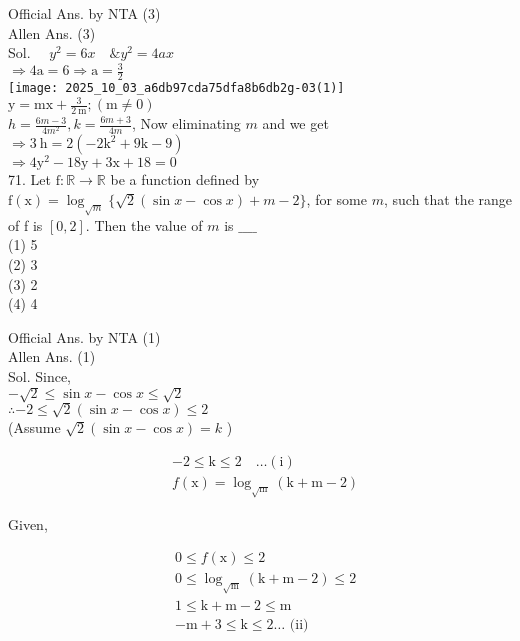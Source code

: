 \documentclass[10pt]{article}
\begin{document}
Official Ans. by NTA (3)\\
Allen Ans. (3)\\
Sol. \(\quad y^{2}=6 x \quad \& y^{2}=4 a x\)\\
\(\Rightarrow 4 \mathrm{a}=6 \Rightarrow \mathrm{a}=\frac{3}{2}\)\\
\texttt{[image: 2025\_10\_03\_a6db97cda75dfa8b6db2g-03(1)]}\\
\(\mathrm{y}=\mathrm{mx}+\frac{3}{2 \mathrm{~m}} ;(\mathrm{m} \neq 0)\)\\
\(h=\frac{6 m-3}{4 m^{2}}, k=\frac{6 m+3}{4 m}\), Now eliminating \(m\) and we get\\
\(\Rightarrow 3 \mathrm{~h}=2\left(-2 \mathrm{k}^{2}+9 \mathrm{k}-9\right)\)\\
\(\Rightarrow 4 \mathrm{y}^{2}-18 \mathrm{y}+3 \mathrm{x}+18=0\)\\
71. Let \(\mathrm{f}: \mathbb{R} \rightarrow \mathbb{R}\) be a function defined by \(\mathrm{f}(\mathrm{x})= \log _{\sqrt{m}}\{\sqrt{2}(\sin x-\cos x)+m-2\}\), for some \(m\), such that the range of f is \([0,2]\). Then the value of \(m\) is \(\_\_\_\_\)\\
(1) 5\\
(2) 3\\
(3) 2\\
(4) 4

Official Ans. by NTA (1)\\
Allen Ans. (1)\\
Sol. Since,\\
\(-\sqrt{2} \leq \sin x-\cos x \leq \sqrt{2}\)\\
\(\therefore-2 \leq \sqrt{2}(\sin x-\cos x) \leq 2\)\\
(Assume \(\sqrt{2}(\sin x-\cos x)=k\) )

\[
\begin{aligned}
& -2 \leq \mathrm{k} \leq 2 \quad \ldots(\mathrm{i}) \\
& f(\mathrm{x})=\log _{\sqrt{\mathrm{m}}}(\mathrm{k}+\mathrm{m}-2)
\end{aligned}
\]

Given,

\[
\begin{aligned}
& 0 \leq f(\mathrm{x}) \leq 2 \\
& 0 \leq \log _{\sqrt{\mathrm{m}}}(\mathrm{k}+\mathrm{m}-2) \leq 2 \\
& 1 \leq \mathrm{k}+\mathrm{m}-2 \leq \mathrm{m} \\
& -\mathrm{m}+3 \leq \mathrm{k} \leq 2 \ldots \text { (ii) }
\end{aligned}
\]
\end{document}
